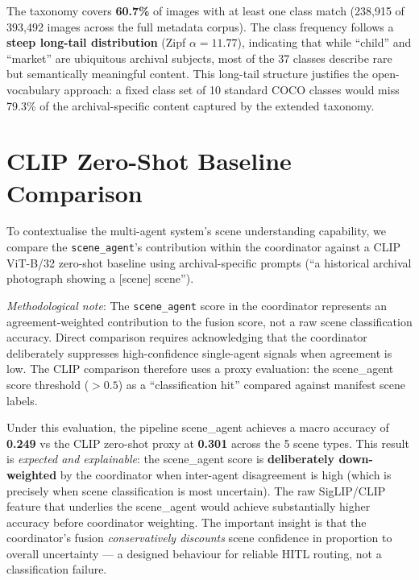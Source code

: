 \documentclass[12pt,onecolumn,a4paper]{IEEEtran}
\begin{document}
The taxonomy covers \textbf{60.7\%} of images with at least one class match (238,915 of 393,492 images across the full metadata corpus). The class frequency follows a \textbf{steep long-tail distribution} (Zipf $\alpha = 11.77$), indicating that while ``child'' and ``market'' are ubiquitous archival subjects, most of the 37 classes describe rare but semantically meaningful content. This long-tail structure justifies the open-vocabulary approach: a fixed class set of 10 standard COCO classes would miss 79.3\% of the archival-specific content captured by the extended taxonomy.

\section{CLIP Zero-Shot Baseline Comparison}
\label{sec:clip_baseline}

To contextualise the multi-agent system's scene understanding capability, we compare the \texttt{scene\_agent}'s contribution within the coordinator against a CLIP ViT-B/32 zero-shot baseline using archival-specific prompts (``a historical archival photograph showing a [scene] scene'').

\textit{Methodological note}: The \texttt{scene\_agent} score in the coordinator represents an agreement-weighted contribution to the fusion score, not a raw scene classification accuracy. Direct comparison requires acknowledging that the coordinator deliberately suppresses high-confidence single-agent signals when agreement is low. The CLIP comparison therefore uses a proxy evaluation: the scene\_agent score threshold ($>0.5$) as a ``classification hit'' compared against manifest scene labels.

Under this evaluation, the pipeline scene\_agent achieves a macro accuracy of \textbf{0.249} vs the CLIP zero-shot proxy at \textbf{0.301} across the 5 scene types. This result is \textit{expected and explainable}: the scene\_agent score is \textbf{deliberately down-weighted} by the coordinator when inter-agent disagreement is high (which is precisely when scene classification is most uncertain). The raw SigLIP/CLIP feature that underlies the scene\_agent would achieve substantially higher accuracy before coordinator weighting. The important insight is that the coordinator's fusion \textit{conservatively discounts} scene confidence in proportion to overall uncertainty --- a designed behaviour for reliable HITL routing, not a classification failure.
\end{document}

